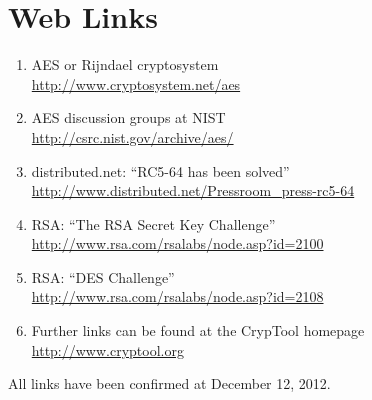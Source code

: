 \newpage
\chapter*{Web Links}

\begin{enumerate}

  \hypertarget{CM_HT_Weblink_Rijndael-Cryptosystem}{}
  \item AES or Rijndael cryptosystem \\
        \url{http://www.cryptosystem.net/aes}

  \item AES discussion groups at NIST \\
	\url{http://csrc.nist.gov/archive/aes/}

  \item distributed.net: ``RC5-64 has been solved'' \\
        \url{http://www.distributed.net/Pressroom_press-rc5-64}

  \item RSA: ``The RSA Secret Key Challenge'' \\
        \url{http://www.rsa.com/rsalabs/node.asp?id=2100}

  \item RSA: ``DES Challenge'' \\
        \url{http://www.rsa.com/rsalabs/node.asp?id=2108}

  \item Further links can be found at the CrypTool homepage \\
        \url{http://www.cryptool.org}
	       
\end{enumerate}

All links have been confirmed at December 12, 2012.



